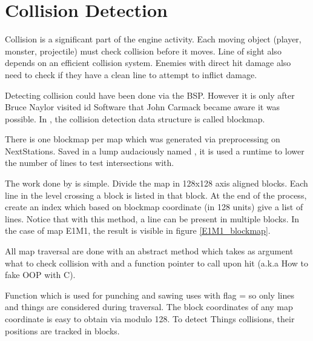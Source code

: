 \section{Collision Detection} \label{blockmapdetails}
Collision is a significant part of the engine activity. Each moving object (player, monster, projectile) must check collision before it moves. Line of sight also depends on an efficient collision system. Enemies with direct hit damage also need to check if they have a clean line to attempt to inflict damage.\\
\par
Detecting collision could have been done via the BSP. However it is only after Bruce Naylor visited id Software that John Carmack became aware it was possible. In \doom, the collision detection data structure is called blockmap.\\
\par
{}
\par
There is one blockmap per map which was generated via  preprocessing on NextStations. Saved in a lump audaciously named , it is used a runtime to lower the number of lines to test intersections with.\\
\par
The work done by  is simple. Divide the map in 128x128 axis aligned blocks. Each line in the level crossing a block is listed in that block. At the end of the process, create an index which based on blockmap coordinate (in 128 units) give a list of lines. Notice that with this method, a line can be present in multiple blocks. In the case of map E1M1, the result is visible in figure \ref{E1M1_blockmap}.


All map traversal are done with an abstract method  which takes as argument what to check collision with and a function pointer to call upon hit (a.k.a How to fake OOP with C).\\
\par
{}
\par
Function  which is used for punching and sawing uses  with flag =  so only lines and things are considered during traversal. The block coordinates of any map coordinate is easy to obtain via modulo 128. To detect Things collisions, their positions are tracked in blocks.\\
\par
{}
